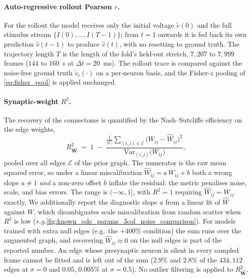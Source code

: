 \documentclass{article}
\def\eg{{\it e.g.}}
\begin{document}
\paragraph{Auto-regressive rollout Pearson $r$.}
For the rollout the model receives only the initial voltage
$\tilde v(0)$ and the full stimulus stream
$\{I(0),\ldots,I(T-1)\}$; from $t = 1$ onwards it is fed back its own
prediction $\hat v(t-1)$ to produce $\hat v(t)$, with no resetting to
ground truth. {\color{revised}The trajectory length $T$ is the length of the fold's held-out stretch, $7{,}207$ to $7{,}999$ frames
($144$ to $160$~s at $\Delta t = 20$~ms).} The
rollout trace is compared against the noise-free ground truth
$\tilde v_i(\cdot)$ on a per-neuron basis, and the Fisher-$z$ pooling
of \cref{eq:fisher_pool} is applied unchanged.

\paragraph{Synaptic-weight $R^2$.}
The recovery of the connectome is quantified by the
Nash--Sutcliffe efficiency on the edge weights,
\begin{equation}
    R^2_{\hat{\mathbf{W}}}
        \;=\; 1 \;-\;
        \frac{\frac{1}{|\mathcal{E}|}\sum_{(i,j)\in\mathcal{E}}
              \big(W_{ij} - \hat{W}_{ij}\big)^2}
             {\mathrm{Var}_{(i,j)}\!\big(W_{ij}\big)},
    \label{eq:r2_identity}
\end{equation}
pooled over all edges $\mathcal{E}$ of the prior graph. The numerator
is the raw mean squared error, so under a linear miscalibration
$\hat{W}_{ij} = a\,W_{ij} + b$ both a wrong slope $a \neq 1$
\emph{and} a non-zero offset $b$ inflate the residual: the metric
penalises noise, scale, and bias errors. The range is
$(-\infty, 1]$, with $R^2 = 1$ requiring $\hat{W}_{ij} = W_{ij}$
exactly. We additionally report the diagnostic slope $a$ from a
linear fit of $\hat{W}$ against $W$, which disambiguates scale
miscalibration from random scatter when $R^2$ is low (\eg \cref{fig:known_ode_params_3col_noise_comparison}). For models
trained with extra null edges (e.g.\ the $+400\%$ condition) the sum
runs over the augmented graph, and recovering
$\hat{W}_{ij} \approx 0$ on the null edges is part of the
reported number. {\color{revised}An edge whose presynaptic neuron is silent in every sampled frame cannot be fitted and is left out of the sum ($2.9\%$ and $2.8\%$ of the $434{,}112$ edges at $\sigma=0$ and $0.05$, $0.005\%$ at $\sigma=0.5$).} No outlier filtering is applied to
$R^2_{\hat{\mathbf{W}}}$.
\end{document}
